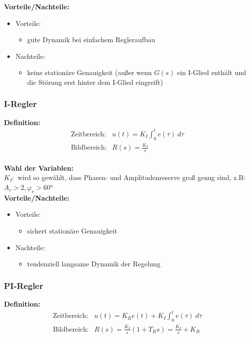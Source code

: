 \documentclass[10pt,a4paper]{article}
\begin{document}
\textbf{Vorteile/Nachteile:}
\begin{itemize}
	\item Vorteile:
	\begin{itemize}
		\item gute Dynamik bei einfachem Regleraufbau
	\end{itemize}
	\item Nachteile:
	\begin{itemize}
		\item keine stationäre Genauigkeit (außer wenn $G(s)$ ein I-Glied enthält und die Störung erst hinter dem I-Glied eingreift)
	\end{itemize}
\end{itemize}

\subsubsection{I-Regler}
\textbf{Definition:}
$$
	\begin{array}{ll}
	\text{Zeitbereich:} & u(t) = K_I \int_0^t e(\tau) ~d\tau \\
	\text{Bildbereich:} & R(s) = \frac{K_I}{s}
	\end{array}
$$ \\

\textbf{Wahl der Variablen:} \\
$K_I:$ wird so gewählt, dass Phasen- und Amplitudenreserve groß genug sind, z.B: $A_r > 2, \varphi_r > 60°$ \\

\textbf{Vorteile/Nachteile:}
\begin{itemize}
	\item Vorteile:
	\begin{itemize}
		\item sichert stationäre Genauigkeit
	\end{itemize}
	\item Nachteile:
	\begin{itemize}
		\item tendenziell langsame Dynamik der Regelung
	\end{itemize}
\end{itemize}

\subsubsection{PI-Regler}
\textbf{Definition:}
$$
	\begin{array}{ll}
	\text{Zeitbereich:} & u(t) = K_R e(t) + K_I \int_0^t e(\tau) ~d\tau \\
	\text{Bildbereich:} & R(s) = \frac{K_I}{s} (1 + T_R s) = \frac{K_I}{s} + K_R
	\end{array}
$$ \\
\end{document}
